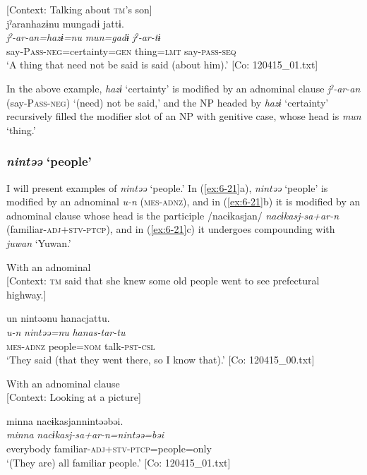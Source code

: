 \ea\label{ex:6-20}
 [Context: Talking about \textsc{tm}’s son]\\

{\TM}
\glll jˀaranhazɨnu  mungadɨ  jattɨ.\\
\textit{jˀ-ar-an=hazɨ=nu}  \textit{mun=gadɨ}  \textit{jˀ-ar-tɨ}\\
    say-P\textsc{ass}-\textsc{neg}=certainty=\textsc{gen}  thing=\textsc{lmt}  say-\textsc{pass}-\textsc{seq}\\
\glt    ‘A thing that need not be said is said (about him).’ [Co: 120415\_01.txt]
\z

In the above example, \textit{hazɨ} ‘certainty’ is modified by an adnominal clause \textit{jˀ-ar-an} (say-P\textsc{ass}-\textsc{neg}) ‘(need) not be said,’ and the NP headed by \textit{hazɨ} ‘certainty’ recursively filled the modifier slot of an NP with genitive case, whose head is \textit{mun} ‘thing.’

\subsubsection{\textit{nintəə} ‘people’}

I will present examples of \textit{nintəə} ‘people.’ In (\ref{ex:6-21}a), \textit{nintəə} ‘people’ is modified by an adnominal \textit{u-n} (\textsc{mes}-\textsc{adnz}), and in (\ref{ex:6-21}b) it is modified by an adnominal clause whose head is the participle /nacɨkasjan/ \textit{nacɨkasj-sa+ar-n} (familiar-\textsc{adj}+\textsc{stv}-\textsc{ptcp}), and in (\ref{ex:6-21}c) it undergoes compounding with \textit{juwan} ‘Yuwan.’

\ea\label{ex:6-21}
\ea With an adnominal\\{}
[Context: \textsc{tm} said that she knew some old people went to see prefectural highway.]

{\TM}
\glll un  nintəənu  hanacjattu.\\
      \textit{u-n}  \textit{nintəə=nu}  \textit{hanas-tar-tu}\\
      \textsc{mes}-\textsc{adnz}  people=\textsc{nom}  talk-\textsc{pst}-\textsc{csl}\\
\glt ‘They said (that they went there, so I know that).’ [Co: 120415\_00.txt]

\ex With an adnominal clause\\{}
[Context: Looking at a picture]

{\TM}
\glll minna  nacɨkasjannintəəbəi.\\
      \textit{minna}  \textit{nacɨkasj-sa+ar-n=nintəə=bəi}\\
      everybody  familiar-\textsc{adj}+\textsc{stv}-\textsc{ptcp}=people=only\\
\glt ‘(They are) all familiar people.’ [Co: 120415\_01.txt]

